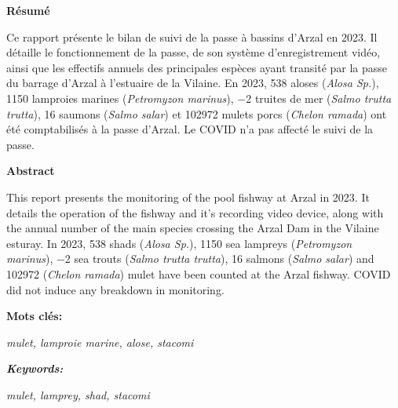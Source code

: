\documentclass[11pt,twocolumn,titlepage,twoside]{article}\usepackage[]{graphicx}\usepackage[]{color}
\begin{document}
\onecolumn
\thispagestyle{empty}
\pagecolor{bleu_EV}
\begin{tcolorbox}[enhanced jigsaw,
                  colback=turquoise_EV!30,%
                  colframe=turquoise_EV,%
                  width=\textwidth,%
                  arc=3mm, auto outer arc,
                  boxrule=5pt,
                  drop shadow={bleu_EV!50!gray!80}
                 ]
\textbf{Résumé}\par

 \vspace{8mm}
    
 Ce rapport présente le bilan de suivi de la passe à bassins d'Arzal en
    \textcolor{orange_EV}{\num{2023}}. Il détaille le fonctionnement de la passe, de son système
    d'enregistrement vidéo, ainsi que les effectifs annuels des principales
    espèces ayant transité par la passe du barrage d'Arzal à l'estuaire de la
    Vilaine. En \textcolor{orange_EV}{\num{2023}}, 
    \textcolor{orange_EV}{\num{538}} aloses (\textit{Alosa
    Sp.}), 
    \textcolor{orange_EV}{\num{1150}} lamproies marines (\textit{Petromyzon
    marinus}), 
    \textcolor{orange_EV}{\num{-2}} truites de mer (\textit{Salmo trutta trutta}),
    \textcolor{orange_EV}{\num{16}} saumons (\textit{Salmo salar}) et
    \textcolor{orange_EV}{\num{102972}} mulets porcs (\textit{Chelon ramada}) ont été
    comptabilisés à la passe d'Arzal. Le COVID n'a pas affecté le suivi de la
    passe. \par
        
   \vspace{8mm}
    
   \textbf{Abstract}\par
   
    \vspace{8mm}
  
    This report presents the monitoring of the pool fishway at Arzal in
    \textcolor{orange_EV}{\num{2023}}. It details the operation of the fishway and it's recording video
    device, along with the annual number of the main species crossing the Arzal
    Dam in the Vilaine esturay.
    In \textcolor{orange_EV}{\num{2023}}, 
    \textcolor{orange_EV}{\num{538}} shads (\textit{Alosa Sp.}),
    \textcolor{orange_EV}{\num{1150}} sea lampreys (\textit{Petromyzon marinus}), 
    \textcolor{orange_EV}{\num{-2}} sea trouts (\textit{Salmo trutta trutta}),
    \textcolor{orange_EV}{\num{16}} salmons (\textit{Salmo salar}) 
    and \textcolor{orange_EV}{\num{102972}} (\textit{Chelon ramada}) mulet have been counted
    at the Arzal fishway. COVID did not induce any breakdown in monitoring. \par

   

    \vspace{8mm}
    \textbf{Mots clés:}\par
     \textit{mulet, lamproie marine, alose, stacomi}\par 
    \vspace{8mm}    
     \textbf{\textit{Keywords:}}\par
     \textit{mulet, lamprey, shad, stacomi}  
\end{tcolorbox}
\end{document}
